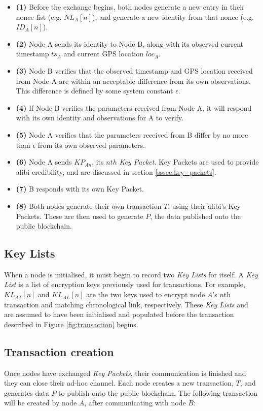 \begin{itemize}
	\item[] \textbf{(1)} Before the exchange begins, both nodes generate a new entry in their nonce list (e.g. $NL_A[n]$), and generate a new identity from that nonce (e.g. $ID_A[n]$).
	\item[] \textbf{(2)} Node A sends its identity to Node B, along with its observed current timestamp $ts_A$ and current GPS location $loc_A$.
	\item[] \textbf{(3)} Node B verifies that the observed timestamp and GPS location received from Node A are within an acceptable difference from its own observations. This difference is defined by some system constant $\epsilon$.
	\item[] \textbf{(4)} If Node B verifies the parameters received from Node A, it will respond with its own identity and observations for A to verify.
	\item[] \textbf{(5)} Node A verifies that the parameters received from B differ by no more than $\epsilon$ from its own observed parameters.
	\item[] \textbf{(6)} Node A sends $KP_{An}$, its $nth$ \textit{Key Packet}. Key Packets are used to provide alibi credibility, and are discussed in section \ref{sssec:key_packets}.
	\item[] \textbf{(7)} B responds with its own Key Packet.
	\item[] \textbf{(8)} Both nodes generate their own transaction $T$, using their alibi's Key Packets. These are then used to generate $P$, the data published onto the public blockchain.
\end{itemize}

\subsection{Key Lists} \label{ssec:key_lists}
When a node is initialised, it must begin to record two \textit{Key Lists} for itself. A \textit{Key List} is a list of encryption keys previously used for transactions. For example, $KL_{AT}[n]$ and $KL_{AL}[n]$ are the two keys used to encrypt node $A$'s $n$th transaction and matching chronological link, respectively. These \textit{Key Lists} and are assumed to have been initialised and populated before the transaction described in Figure \ref{fig:transaction} begins.

\subsection{Transaction creation}
Once nodes have exchanged \textit{Key Packets}, their communication is finished and they can close their ad-hoc channel. Each node creates a new transaction, $T$, and generates data $P$ to publish onto the public blockchain. The following transaction will be created by node $A$, after communicating with node $B$:
\\

